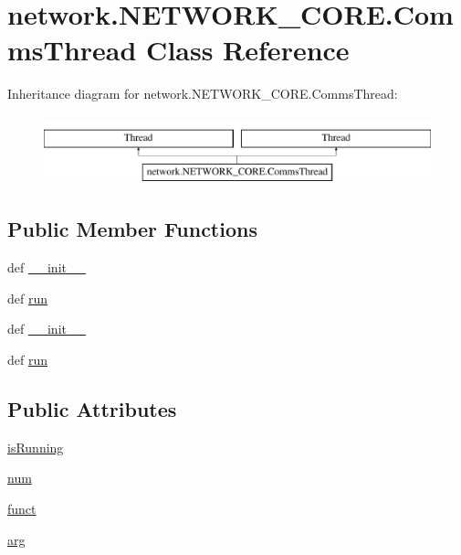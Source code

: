 \hypertarget{classnetwork_1_1NETWORK__CORE_1_1CommsThread}{}\section{network.\+N\+E\+T\+W\+O\+R\+K\+\_\+\+C\+O\+R\+E.\+Comms\+Thread Class Reference}
\label{classnetwork_1_1NETWORK__CORE_1_1CommsThread}
Inheritance diagram for network.\+N\+E\+T\+W\+O\+R\+K\+\_\+\+C\+O\+R\+E.\+Comms\+Thread\+:\begin{figure}[H]
\begin{center}
\leavevmode
\includegraphics[height=2.000000cm]{classnetwork_1_1NETWORK__CORE_1_1CommsThread}
\end{center}
\end{figure}
\subsection*{Public Member Functions}
\begin{DoxyCompactItemize}
\item 
def \hyperlink{classnetwork_1_1NETWORK__CORE_1_1CommsThread_ab3b9b67bc77d6ed6d5575e97d6031ac6}{\+\_\+\+\_\+init\+\_\+\+\_\+}
\item 
def \hyperlink{classnetwork_1_1NETWORK__CORE_1_1CommsThread_a3d9c7b5081b08434f9c0c70665ebc5f4}{run}
\item 
def \hyperlink{classnetwork_1_1NETWORK__CORE_1_1CommsThread_ab3b9b67bc77d6ed6d5575e97d6031ac6}{\+\_\+\+\_\+init\+\_\+\+\_\+}
\item 
def \hyperlink{classnetwork_1_1NETWORK__CORE_1_1CommsThread_a3d9c7b5081b08434f9c0c70665ebc5f4}{run}
\end{DoxyCompactItemize}
\subsection*{Public Attributes}
\begin{DoxyCompactItemize}
\item 
\hyperlink{classnetwork_1_1NETWORK__CORE_1_1CommsThread_a145170fa3ac9bc02882add7517e0f7fb}{is\+Running}
\item 
\hyperlink{classnetwork_1_1NETWORK__CORE_1_1CommsThread_ad9629d20873b3079e6dc087f6fab8991}{num}
\item 
\hyperlink{classnetwork_1_1NETWORK__CORE_1_1CommsThread_a266630b3cfcdac365332bab1b70cd811}{funct}
\item 
\hyperlink{classnetwork_1_1NETWORK__CORE_1_1CommsThread_ab1cf0c0ed573a7a2f840f82be860a3a9}{arg}
\end{DoxyCompactItemize}


